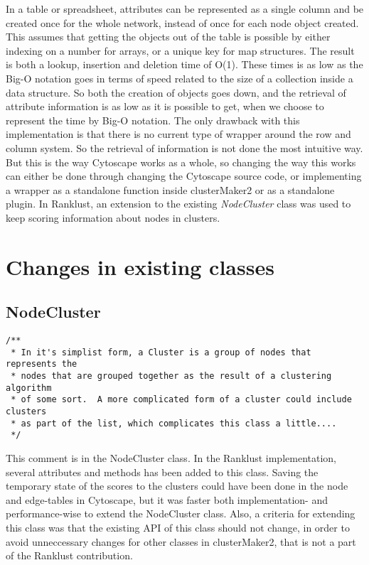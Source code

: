 In a table or spreadsheet, attributes can be represented as a single column and
be created once for the whole network, instead of once for each node object
created. This assumes that getting the objects out of the table is possible by
either indexing on a number for arrays, or a unique key for map structures.
The result is both a lookup, insertion and deletion time of O(1). These times is
as low as the Big-O notation goes in terms of speed related to the size of
a collection inside a data structure. So both the creation of objects goes
down, and the retrieval of attribute information is as low as it is possible to
get, when we choose to represent the time by Big-O notation. The only drawback
with this implementation is that there is no current type of wrapper around the
row and column system. So the retrieval of information is not done the most
intuitive way. But this is the way Cytoscape works as a whole, so changing the
way this works can either be done through changing the Cytoscape source code, or
implementing a wrapper as a standalone function inside clusterMaker2 or as
a standalone plugin. In Ranklust, an extension to the existing
\textit{NodeCluster} class was used to keep scoring information about nodes in
clusters.

\section{Changes in existing classes}
\subsection{NodeCluster}
\begin{verbatim}
/**
 * In it's simplist form, a Cluster is a group of nodes that represents the
 * nodes that are grouped together as the result of a clustering algorithm
 * of some sort.  A more complicated form of a cluster could include clusters
 * as part of the list, which complicates this class a little....
 */
\end{verbatim}

This comment is in the NodeCluster class. In the Ranklust implementation,
several attributes and methods has been added to this class. Saving the
temporary state of the scores to the clusters could have been done in the node
and edge-tables in Cytoscape, but it was faster both implementation- and
performance-wise to extend the NodeCluster class. Also, a criteria for extending
this class was that the existing API of this class should not change, in order
to avoid unneccessary changes for other classes in clusterMaker2, that is not
a part of the Ranklust contribution. 


